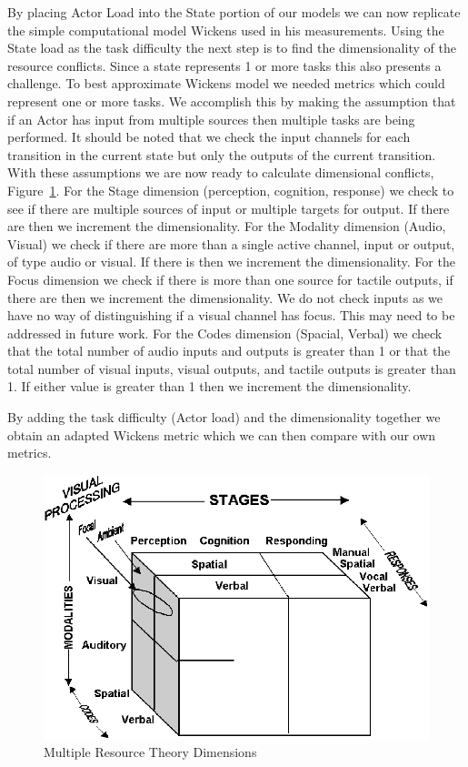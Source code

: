 By placing Actor Load into the State portion of our models we can now replicate the simple computational model Wickens used in his measurements.  Using the State load as the task difficulty the next step is to find the dimensionality of the resource conflicts.  Since a state represents 1 or more tasks this also presents a challenge.  To best approximate Wickens model we needed metrics which could represent one or more tasks.  We accomplish this by making the assumption that if an Actor has input from multiple sources then multiple tasks are being performed.  It should be noted that we check the input channels for each transition in the current state but only the outputs of the current transition.  With these assumptions we are now ready to calculate dimensional conflicts, Figure~\ref{fig:multipleresourcetheory}.
For the Stage dimension (perception, cognition, response) we check to see if there are multiple sources of input or multiple targets for output.  If there are then we increment the dimensionality.   
For the Modality dimension (Audio, Visual) we check if there are more than a single active channel, input or output, of type audio or visual.  If there is then we increment the dimensionality.  
For the Focus dimension we check if there is more than one source for tactile outputs, if there are then we increment the dimensionality.  We do not check inputs as we have no way of distinguishing if a visual channel has focus.  This may need to be addressed in future work. 
For the Codes dimension (Spacial, Verbal) we check that the total number of audio inputs and outputs is greater than 1 or that the total number of visual inputs, visual outputs, and tactile outputs is greater than 1.  If either value is greater than 1 then we increment the dimensionality.  

By adding the task difficulty (Actor load) and the dimensionality together we obtain an adapted Wickens metric which we can then compare with our own metrics.

\begin{figure}[h]
\begin{center}
\includegraphics[width=6in]{multresourcetheory.png}
\caption{Multiple Resource Theory Dimensions}
\label{fig:multipleresourcetheory}
\end{center}
\end{figure}

